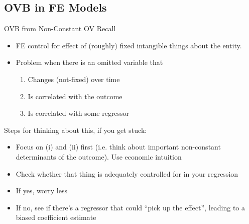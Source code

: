 \documentclass[aspectratio=169, handout]{beamer}
\begin{document}
\subsection{OVB in FE Models}


{\footnotesize
\begin{frame}[shrink]{OVB from Non-Constant OV}
Recall
\begin{itemize}
  \item FE control for effect of (roughly) \alert{fixed} intangible
    things about the entity.
  \item Problem when there is an omitted variable that
    \begin{enumerate}
      \item \alert{Changes} (not-fixed) over time
      \item Is correlated with the outcome
      \item Is correlated with some regressor
    \end{enumerate}
\end{itemize}
Steps for thinking about this, if you get stuck:
\begin{itemize}
  \item Focus on (i) and (ii) first (i.e. think about important
    non-constant determinants of the outcome).
    Use economic intuition
  \item Check whether that thing is adequately controlled for in your
    regression
  \item If yes, worry less
  \item If no, see if there's a regressor that could ``pick up the
    effect'', leading to a biased coefficient estimate
\end{itemize}
\end{frame}
}
\end{document}
